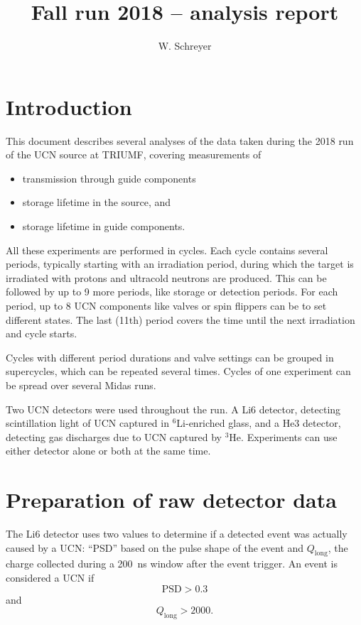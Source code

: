 \documentclass[10pt,letterpaper]{article}
\author{W. Schreyer}
\title{Fall run 2018 -- analysis report}
\begin{document}
\maketitle

\tableofcontents

\section{Introduction}

This document describes several analyses of the data taken during the 2018 run of the UCN source at TRIUMF, covering measurements of
\begin{itemize}
\item transmission through guide components
\item storage lifetime in the source, and
\item storage lifetime in guide components.
\end{itemize}

All these experiments are performed in cycles. Each cycle contains several periods, typically starting with an irradiation period, during which the target is irradiated with protons and ultracold neutrons are produced. This can be followed by up to 9 more periods, like storage or detection periods. For each period, up to 8 UCN components like valves or spin flippers can be to set different states. The last (11th) period covers the time until the next irradiation and cycle starts.

Cycles with different period durations and valve settings can be grouped in supercycles, which can be repeated several times. Cycles of one experiment can be spread over several Midas runs.

Two UCN detectors were used throughout the run. A Li6 detector, detecting scintillation light of UCN captured in $^6$Li-enriched glass, and a He3 detector, detecting gas discharges due to UCN captured by $^3$He. Experiments can use either detector alone or both at the same time.


\section{Preparation of raw detector data}

The Li6 detector uses two values to determine if a detected event was actually caused by a UCN: ``PSD'' based on the pulse shape of the event and $Q_\mathrm{long}$, the charge collected during a \SI{200}{\nano\second} window after the event trigger. An event is considered a UCN if
\begin{equation}
\mathrm{PSD} > 0.3
\end{equation}
and
\begin{equation}
Q_\mathrm{long} > 2000.
\end{equation}
\end{document}
